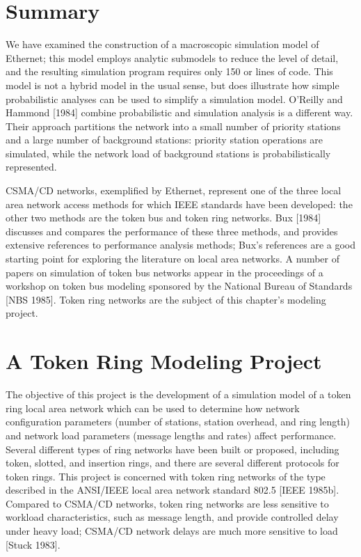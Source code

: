 \section{Summary}

We have examined the construction of a macroscopic simulation model of Ethernet; this model employs analytic submodels to reduce the level of detail, and the resulting simulation program requires only 150 or lines of code. This model is not a hybrid model in the usual sense, but does illustrate how simple probabilistic analyses can be used to simplify a simulation model. O'Reilly and Hammond [1984] combine probabilistic and simulation analysis is a different way. Their approach partitions the network into a small number of priority stations and a large number of background stations: priority station operations are simulated, while the network load of background stations is probabilistically represented.

CSMA/CD networks, exemplified by Ethernet, represent one of the three local area network access methods for which IEEE standards have been developed: the other two methods are the token bus and token ring networks. Bux [1984] discusses and compares the performance of these three methods, and provides extensive references to performance analysis methods; Bux's references are a good starting point for exploring the literature on local area networks. A number of papers on simulation of token bus networks appear in the proceedings of a workshop on token bus modeling sponsored by the National Bureau of Standards [NBS 1985]. Token ring networks are the subject of this chapter's modeling project.

\section{A Token Ring Modeling Project}

The objective of this project is the development of a simulation model of a token ring local area network which can be used to determine how network configuration parameters (number of stations, station overhead, and ring length) and network load parameters (message lengths and rates) affect performance. Several different types of ring networks have been built or proposed, including token, slotted, and insertion rings, and there are several different protocols for token rings. This project is concerned with token ring networks of the type described in the ANSI/IEEE local area network standard 802.5 [IEEE 1985b]. Compared to CSMA/CD networks, token ring networks are less sensitive to workload characteristics, such as message length, and provide controlled delay under heavy load; CSMA/CD network delays are much more sensitive to load [Stuck 1983].

